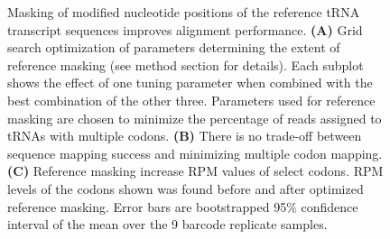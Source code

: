 \documentclass[9pt,lineno]{elife}
\begin{document}
\begin{figure}[ht!]
\centering
{}
\caption{
Masking of modified nucleotide positions of the reference tRNA transcript sequences improves alignment performance.
\textbf{(A)} Grid search optimization of parameters determining the extent of reference masking (see method section for details).
Each subplot shows the effect of one tuning parameter when combined with the best combination of the other three.
Parameters used for reference masking are chosen to minimize the percentage of reads assigned to tRNAs with multiple codons.
\textbf{(B)} There is no trade-off between sequence mapping success and minimizing multiple codon mapping.
\textbf{(C)} Reference masking increase RPM values of select codons.
RPM levels of the codons shown was found before and after optimized reference masking.
Error bars are bootstrapped 95\% confidence interval of the mean over the 9  barcode replicate samples.
}
\label{fig:Fig3}


\end{figure}
\end{document}
